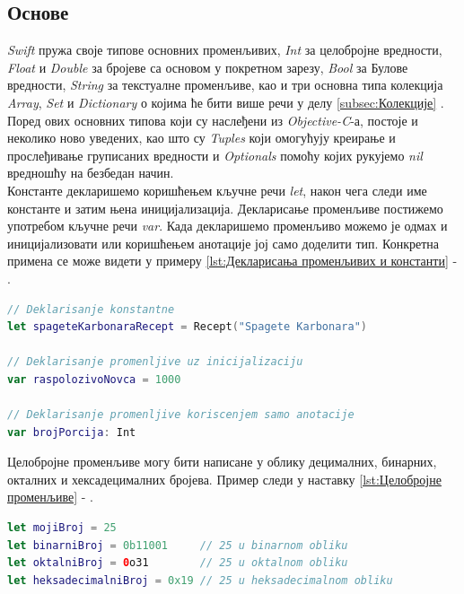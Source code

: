 \documentclass[12pt,oneside]{memoir}
\begin{document}
\subsection{Основе}

\indent \textit{Swift} пружа своје типове основних променљивих, \textit{Int} за целобројне вредности, \textit{Float} и \textit{Double} за бројеве са основом у покретном зарезу, \textit{Bool} за Булове вредности, \textit{String} за текстуалне променљиве, као и три основна типа колекција \textit{Array}, \textit{Set} и \textit{Dictionary} о којима ће бити више речи у делу \ref{subsec:Колекције} . 
\\ 
\indent Поред ових основних типова који су наслеђени из \textit{Objective-C}-а, постоје и неколико ново уведених, као што су \textit{Tuples} који омогућују креирање и прослеђивање груписаних вредности и \textit{Optionals} помоћу којих рукујемо \textit{nil} вредношћу на безбедан начин.
\\
\indent Константе декларишемо коришћењем кључне речи \textit{let}, након чега следи име константе и затим њена иницијализација. Декларисање променљиве постижемо употребом кључне речи \textit{var}. Када декларишемо променљиво можемо је одмах и иницијализовати или коришћењем анотације јој само доделити тип. Конкретна примена се може видети у примеру \ref{lst:Декларисања променљивих и константи} - .

\begin{lstlisting}[caption=\textit{{Декларисања променљивих и константи}}, label={lst:Декларисања променљивих и константи}, language=Swift, frame=single]
// Deklarisanje konstantne
let spageteKarbonaraRecept = Recept("Spagete Karbonara")

// Deklarisanje promenljive uz inicijalizaciju
var raspolozivoNovca = 1000

// Deklarisanje promenljive koriscenjem samo anotacije
var brojPorcija: Int
\end{lstlisting}

\indent Целобројне променљиве могу бити написане у облику децималних, бинарних, окталних и хексадецималних бројева. Пример следи у наставку \ref{lst:Целобројне променљиве} - .

\begin{lstlisting}[caption=\textit{{Целобројне променљиве}}, label={lst:Целобројне променљиве}, language=Swift, frame=single]
let mojiBroj = 25 
let binarniBroj = 0b11001     // 25 u binarnom obliku
let oktalniBroj = 0o31        // 25 u oktalnom obliku
let heksadecimalniBroj = 0x19 // 25 u heksadecimalnom obliku
\end{lstlisting}
\end{document}
